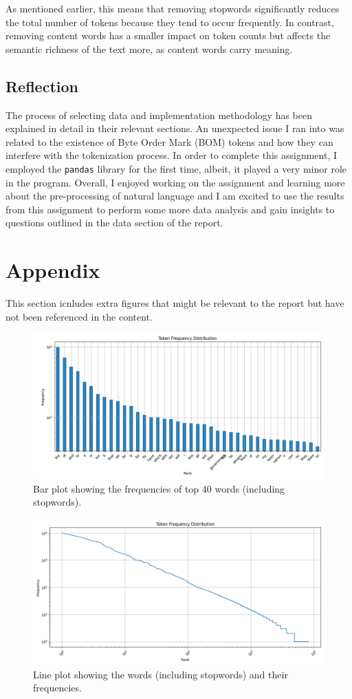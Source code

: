 \documentclass[titlepage]{article}
\begin{document}
As mentioned earlier, this means that removing stopwords significantly reduces the total number of 
tokens because they tend to occur frequently. In contrast, removing content words has a smaller
impact on token counts but affects the semantic richness of the text more, as content words carry meaning.

\subsection{Reflection}
The process of selecting data and implementation methodology has been explained in detail in their 
relevant sections. An unexpected issue I ran into was related to the existence of Byte Order Mark (BOM)
tokens and how they can interfere with the tokenization process. In order to complete this assignment, 
I employed the \texttt{pandas} library for the first time, albeit, it played a very minor role in the 
program. Overall, I enjoyed working on the assignment and learning more about the pre-processing of natural
language and I am excited to use the results from this assignment to perform some more data analysis and 
gain insights to questions outlined in the data section of the report.

\section{Appendix}
This section icnludes extra figures that might be relevant to the report but have not been referenced 
in the content.

\begin{figure}[H]
    \includegraphics[width=\textwidth]{figures/bar_plot_stopwords.png}
    \caption{Bar plot showing the frequencies of top 40 words (including stopwords).}
    \label{fig:FigBarStop}
\end{figure}

\begin{figure}[H]
    \centering
    \includegraphics[width=\textwidth]{figures/line_plot_stopwords.png}
    \caption{Line plot showing the words (including stopwords) and their frequencies.}
    \label{fig:FigLineStop}
\end{figure}
\end{document}
